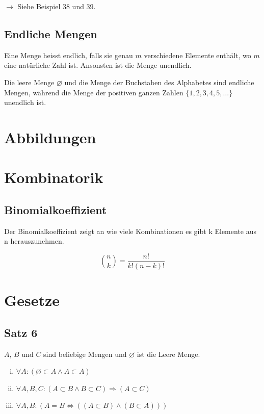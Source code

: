 \documentclass[12pt, a4paper, oneside]{article}
\begin{document}
$\rightarrow$ Siehe Beispiel 38 und 39.

\subsection{Endliche Mengen}
Eine Menge heisst endlich, falls sie genau $m$ verschiedene Elemente enthält, wo $m$ eine natürliche Zahl ist. Ansonsten ist die Menge unendlich.

Die leere Menge $\varnothing$ und die Menge der Buchstaben des Alphabetes sind endliche Mengen, während die Menge der positiven ganzen Zahlen $\{1, 2, 3, 4, 5,\dots\}$ unendlich ist.

\newpage
\section{Abbildungen}

\newpage
\section{Kombinatorik}
\subsection{Binomialkoeffizient}
Der Binomialkoeffizient zeigt an wie viele Kombinationen es gibt k Elemente aus n herauszunehmen.

\begin{equation}
  \binom{n}{k} = \frac{n!}{k!(n-k)!}
\end{equation}


%
%
\newpage
\section{Gesetze}
\subsection{Satz 6}
$A$, $B$ und $C$ sind beliebige Mengen und $\varnothing$ ist die Leere Menge.
\begin{enumerate}[(i)]
  \item $\forall A : (\varnothing \subset A \land A \subset A) $
  \item $\forall A, B, C : (A \subset B \land B \subset C) \Longrightarrow (A \subset C)$
  \item $\forall A, B : (A = B \Longleftrightarrow ((A \subset B) \land (B \subset A)))$
  
\end{enumerate}
\end{document}
